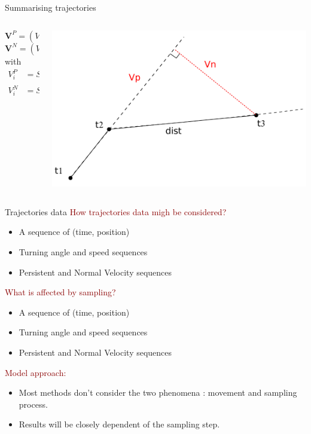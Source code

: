\documentclass{beamer}\usepackage[]{graphicx}\usepackage[]{color}
\newcommand{\emphase}[1]{\textcolor{darkred}{#1}}
\newcommand{\paragraph}[1]{\emphase{#1}}
\begin{document}
\begin{frame}{Summarising trajectories}
{\begin{columns}
\begin{column}{0.4\textwidth}
  $$\boldsymbol{V}^P=(V^P_{2}, \ldots,V^P_{N})$$
    $$\boldsymbol{V}^N=(V^N_{2}, \ldots,V^N_{N})$$
    with 
  \begin{align*}
  V^P_i&=S_i \, cos(\phi_i)\\
  V^N_i&=S_i \, sin(\phi_i)
  \end{align*}
  \end{column}
  \begin{column}{0.6\textwidth}
  \includegraphics[scale=0.3]{Speed2.pdf}
  \end{column}
  \end{columns}
}
\end{frame}


\begin{frame}{Trajectories data}
\paragraph{How trajectories data migh be considered?}
\begin{itemize}
\item A sequence of (time, position)
\item Turning angle and speed sequences
\item Persistent and Normal Velocity sequences
\end{itemize}
\pause
\paragraph{What is affected by sampling?}
\begin{itemize}
\item A sequence of (time, position)
\item Turning angle and speed sequences
\item Persistent and Normal Velocity sequences
\end{itemize}
\pause
\paragraph{Model approach:}
\begin{itemize}
\item Most methods don't consider the two phenomena : movement and sampling process.
  \item Results will be closely dependent of the sampling step.
  \end{itemize}
\end{frame}
\end{document}
